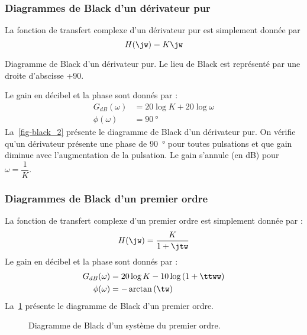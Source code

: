 \subsubsection{Diagrammes de Black d'un dérivateur pur}
La fonction de transfert complexe d'un dérivateur pur est simplement donnée par
\[
    H(\jw)=K\jw
\]
\begin{marginfigure}
    \centering
    \resizebox{\linewidth}{!}{}
    \caption{Diagramme de Black d'un dérivateur pur. Le lieu de Black
             est représenté par une droite d'abscisse +90\degree.
             \label{fig-black_2}}
\end{marginfigure}
Le gain en décibel et la phase sont donnés par :
\begin{align*}
    G_{dB}(\omega)&=20\log{K}+20\log{\omega} \\
      \phi(\omega)&=\SI{90}{\degree}
\end{align*}
La~\cref{fig-black_2} présente le diagramme de Black d'un dérivateur pur. On 
vérifie qu'un dérivateur présente une phase de \SI{+90}{\degree} pour toutes
pulsations et que gain diminue avec l'augmentation de la pulsation. Le gain 
s'annule (en \si{\dB}) pour $\omega=\dfrac{1}{K}$.
\newpage
\restoregeometry
\captionsetup{width=0.9\linewidth}
\subsubsection{Diagrammes de Black d'un premier ordre}
La fonction de transfert complexe d'un premier ordre est simplement donnée par :
\[
    H(\jw)=\dfrac{K}{1+\jtw}
\]
Le gain en décibel et la phase sont donnés par :
\begin{align*}
    G_{dB}(\omega)&=20\log{K}-10\log{\left(1+\ttww\right)} \\
      \phi(\omega)&=-\arctan{(\tw)}
\end{align*}
La~\cref{fig-black_3} présente le diagramme de Black d'un premier ordre.
\begin{figure}[!h]
    \centering
    
    \caption{Diagramme de Black d'un système du premier ordre. 
    \label{fig-black_3}}
\end{figure}
